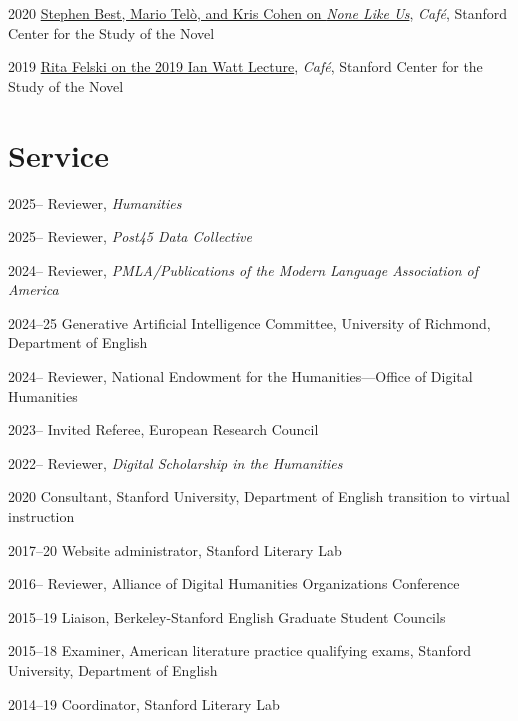 \documentclass[12pt,letterpaper]{report}
\begin{document}
\begin{tablist}
	\item[2020] \tab{}\href{https://web.archive.org/web/20220429093211/https://novel.stanford.edu/csn-cafe/2021/7/23/books-at-the-center-stephen-best-mario-tel-and-kris-cohen-on-none-like-us-101019}{Stephen Best, Mario Telò, and Kris Cohen on \emph{None Like Us}}, \emph{Café}, Stanford Center for the Study of the Novel
	\item[2019] \tab{}\href{https://web.archive.org/web/20220429093144/https://novel.stanford.edu/csn-cafe/2021/7/23/rita-felski-on-her-2019-ian-watt-lecture-5319}{Rita Felski on the 2019 Ian Watt Lecture}, \emph{Café}, Stanford Center for the Study of the Novel
\end{tablist}

\section*{Service}

\begin{tablist}
	\item[2025--] \tab{}Reviewer, \emph{Humanities}
	\item[2025--] \tab{}Reviewer, \emph{Post45 Data Collective}
	\item[2024--] \tab{}Reviewer, \emph{PMLA/Publications of the Modern Language Association of America}
	\item[2024--25] \tab{}Generative Artificial Intelligence Committee, University of Richmond, Department of English
	\item[2024--] \tab{}Reviewer, National Endowment for the Humanities—Office of Digital Humanities
	\item[2023--] \tab{}Invited Referee, European Research Council
	\item[2022--] \tab{}Reviewer, \textit{Digital Scholarship in the Humanities}
	\item[2020] \tab{}Consultant, Stanford University, Department of English transition to virtual instruction
	\item[2017--20] \tab{}Website administrator, Stanford Literary Lab
	\item[2016--] \tab{}Reviewer, Alliance of Digital Humanities Organizations Conference
	\item[2015--19] \tab{}Liaison, Berkeley-Stanford English Graduate Student Councils
	\item[2015--18] \tab{}Examiner, American literature practice qualifying exams, Stanford University, Department of English
	\item[2014--19] \tab{}Coordinator, Stanford Literary Lab
\end{tablist}
\end{document}
